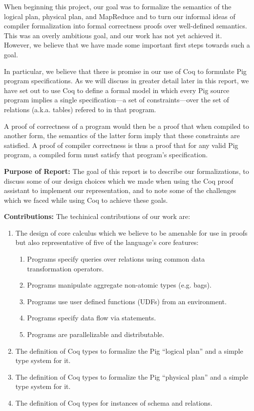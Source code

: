 When beginning this project, our goal was to formalize the semantics of the logical plan, physical plan, and MapReduce and to turn our informal ideas of compiler formalization into formal correctness proofs over well-defined semantics. This was an overly ambitious goal, and our work has not yet achieved it. However, we believe that we have made some important first steps
towards such a goal.

In particular, we believe that there is promise in our use of Coq to formulate Pig program specifications. As we will discuss in greater detail later in this report, we have set out to use Coq to define a formal model in which every Pig source program implies a single specification---a set of constraints---over the set of relations (a.k.a. tables) refered to in that program.

A proof of correctness of a program would then be a proof that when compiled to another form, the semantics of the latter form imply that these constraints are satisfied. A proof of compiler correctness is thus a proof that for any valid Pig program, a compiled form must satisfy that program's specification.

\textbf{Purpose of Report:} The goal of this report is to describe our formalizations, to discuss some of our design choices which we made when using the Coq proof assistant to implement our representation, and to note some of the challenges which we faced while using Coq to achieve these goals.

\textbf{Contributions:} The techinical contributions of our work are:

\begin{enumerate}
  \item The design of core calculus which we believe to be amenable for use
	      in proofs but also representative of five of the language's core features:
	\begin{enumerate}
		\item Programs specify queries over relations using common data
		      transformation operators.
		\item Programs manipulate aggregate non-atomic types (e.g. bags).
		\item Programs use user defined functions (UDFs) from an environment.
		\item Programs specify data flow via statements.
		\item Programs are parallelizable and distributable.
	\end{enumerate}
  \item The definition of Coq types to formalize the Pig ``logical plan'' and
	      a simple type system for it.
  \item The definition of Coq types to formalize the Pig ``physical plan''
	      and a simple type system for it.
  \item The definition of Coq types for instances of schema and relations.
\end{enumerate}

